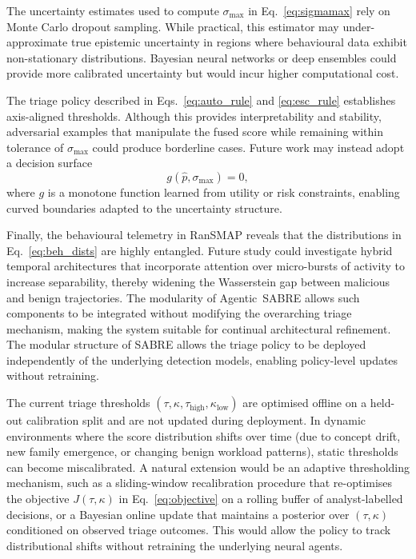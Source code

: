 \documentclass[3p]{elsarticle}
\begin{document}
The uncertainty estimates used to compute \(\sigma_{\max}\) in Eq.~\eqref{eq:sigmamax} rely on Monte Carlo dropout sampling. While practical, this estimator may under-approximate true epistemic uncertainty in regions where behavioural data exhibit non-stationary distributions. Bayesian neural networks or deep ensembles could provide more calibrated uncertainty but would incur higher computational cost.

The triage policy described in Eqs.~\eqref{eq:auto_rule} and \eqref{eq:esc_rule} establishes axis-aligned thresholds. Although this provides interpretability and stability, adversarial examples that manipulate the fused score while remaining within tolerance of \(\sigma_{\max}\) could produce borderline cases. Future work may instead adopt a decision surface
\begin{equation}
g(\hat{p},\sigma_{\max}) = 0,
\label{eq:nonlinear_boundary}
\end{equation}
where \(g\) is a monotone function learned from utility or risk constraints, enabling curved boundaries adapted to the uncertainty structure.

Finally, the behavioural telemetry in RanSMAP reveals that the distributions in Eq.~\eqref{eq:beh_dists} are highly entangled. Future study could investigate hybrid temporal architectures that incorporate attention over micro-bursts of activity to increase separability, thereby widening the Wasserstein gap between malicious and benign trajectories. The modularity of Agentic~SABRE allows such components to be integrated without modifying the overarching triage mechanism, making the system suitable for continual architectural refinement.
The modular structure of SABRE allows the triage policy to be deployed independently of the underlying detection models, enabling policy-level updates without retraining.

\begin{changedblock}
The current triage thresholds $(\tau, \kappa, \tau_{\text{high}}, \kappa_{\text{low}})$ are optimised offline on a held-out calibration split and are not updated during deployment. In dynamic environments where the score distribution shifts over time (due to concept drift, new family emergence, or changing benign workload patterns), static thresholds can become miscalibrated. A natural extension would be an adaptive thresholding mechanism, such as a sliding-window recalibration procedure that re-optimises the objective $J(\tau,\kappa)$ in Eq.~\eqref{eq:objective} on a rolling buffer of analyst-labelled decisions, or a Bayesian online update that maintains a posterior over $(\tau, \kappa)$ conditioned on observed triage outcomes. This would allow the policy to track distributional shifts without retraining the underlying neural agents.
\end{changedblock}
\end{document}
